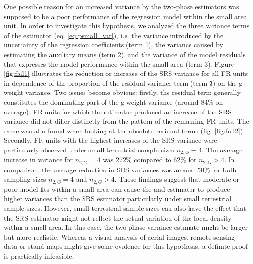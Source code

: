 One possible reason for an increased variance by the two-phase estimators was supposed to be a poor performance of the regression model within the small area unit. In order to investigate this hypothesis, we analyzed the three variance terms of the  \psmall{} estimator (eq. \ref{eq:psmall_var}), i.e. the variance introduced by the uncertainty of the regression coefficients (term 1), the variance caused by estimating the auxiliary means (term 2), and the variance of the model residuals that expresses the model performance within the small area (term 3). Figure \ref{fig:fail1} illustrates the reduction or increase of the SRS variance for all FR units in dependence of the proportion of the residual variance term (term 3) on the g-weight variance. Two issues become obvious: firstly, the residual term generally constitutes the dominating part of the g-weight variance (around 84\% on average). FR units for which the \psmall{} estimator produced an increase of the SRS variance did not differ distinctly from the pattern of the remaining FR units. The same was also found when looking at the absolute residual terms (fig. \ref{fig:fail2}). Secondly, FR units with the highest increases of the SRS variance were particularly observed under small terrestrial sample sizes $n_{2,G} = 4$. The average increase in variance for $n_{2,G} = 4$ was 272\% compared to 62\% for $n_{2,G} > 4$. In comparison, the average reduction in SRS variances was around 50\% for both sampling sizes $n_{2,G} = 4$ and $n_{2,G} > 4$. These findings suggest that moderate or poor model fits within a small area can cause the \psmall{} and \extpsynth{} estimator to produce higher variances than the SRS estimator particularly under small terrestrial sample sizes. However, small terrestrial sample sizes can also have the effect that the SRS estimator might not reflect the actual variation of the local density within a small area. In this case, the two-phase variance estimate might be larger but more realistic. Whereas a visual analysis of aerial images, remote sensing data or stand maps might give some evidence for this hypothesis, a definite proof is practically infeasible.





